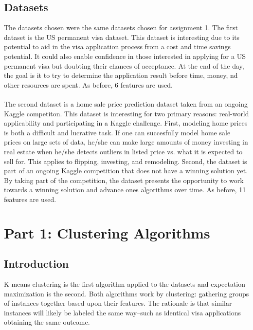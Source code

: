 \documentclass[h]{article}
\begin{document}
\subsection*{Datasets}  
The datasets chosen were the same datasets chosen for assignment 1.  The first dataset is the US 
permanent visa dataset.  This dataset is interesting due to its potential to aid in the visa application process 
from a cost and time savings potential. It could also enable confidence in those interested in applying for a 
US permanent visa but doubting their chances of acceptance. 
At the end of the day, the goal is it to try to determine the application result before time, money, 
nd other resources are spent.   As before, 6 features are used. 
\\  \\
The second dataset is a home sale price prediction dataset taken from an ongoing 
Kaggle competiton.  This dataset is interesting for two primary reasons: real-world applicability and participating in a Kaggle challenge.
 First, modeling home prices is both a difficult and lucrative task. 
 If one can succesfully model home sale prices on large sets of data, he/she can make large amounts of money 
 investing in real estate when he/she detects outliers in listed price vs. what it is expected to sell for. 
 This applies to flipping, investing, and remodeling. 
 Second, the dataset is part of an ongoing Kaggle competition that does not have a winning solution yet.
  By taking part of the competition, the dataset presents the opportunity to work towards a winning solution 
  and advance ones algorithms over time. As before, 11 features are used. 

\section*{Part 1: Clustering Algorithms}
\subsection*{Introduction}  
K-means clustering is the first algorithm applied to the datasets and expectation maximization is the second. 
 Both algorithms work by clustering: gathering groups of instances together 
 based upon their features.  The rationale is that similar instances will likely 
 be labeled the same way--such as identical visa applications obtaining the same 
 outcome.
\end{document}
